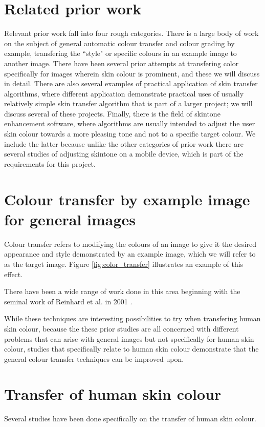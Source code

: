 \section{Related prior work}

Relevant prior work fall into four rough categories. There is a large body of work on the subject of general automatic colour transfer and colour grading by example, transfering the ``style" or specific colours in an example image to another image. There have been several prior attempts at transfering color specifically for images wherein skin colour is prominent, and these we will discuss in detail. There are also several examples of practical application of skin transfer algorithms, where different application demonstrate practical uses of usually relatively simple skin transfer algorithm that is part of a larger project; we will discuss several of these projects. Finally, there is the field of skintone enhancement software, where algorithms are usually intended to adjust the user skin colour towards a more pleasing tone and not to a specific target colour. We include the latter because unlike the other categories of prior work there are several studies of adjusting skintone on a mobile device, which is part of the requirements for this project.

\section{Colour transfer by example image for general images}
Colour transfer refers to modifying the colours of an image to give it the desired appearance and style demonstrated by an example image, which we will refer to as the target image. Figure \ref{fig:color_transfer} illustrates an example of this effect.

There have been a wide range of work done in this area beginning with the seminal work of Reinhard et al. in 2001 \cite{reinhard_2001_transfer}. 

While these techniques are interesting possibilities to try when transfering human skin colour, because the these prior studies are all concerned with different problems that can arise with general images but not specifically for human skin colour, studies that specifically relate to human skin colour demonstrate that the general colour transfer techniques can be improved upon.

\section{Transfer of human skin colour}
Several studies have been done specifically on the transfer of human skin colour.

